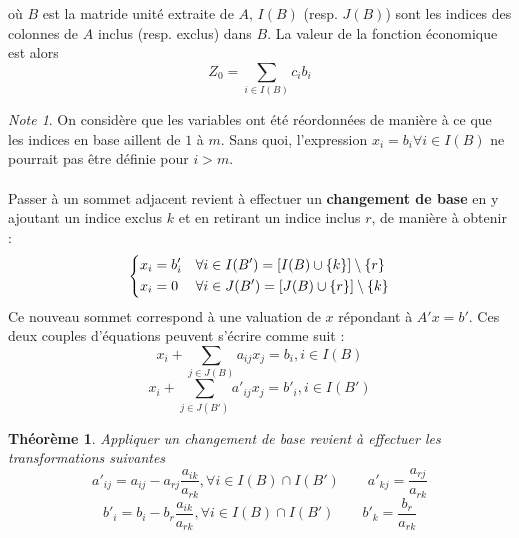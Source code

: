 \documentclass[a4paper]{report}
\theoremstyle{definition}
\theoremstyle{remark}
\newtheorem*{note}{Note}
\theoremstyle{plain}
\newtheorem{theorem}{Théorème}
\begin{document}
où $B$ est la matride unité extraite de \(A\), $I(B)$ (resp. $J(B)$) sont les
indices des colonnes de $A$ inclus (resp. exclus) dans $B$. La valeur de la
fonction économique est alors
\[Z_0=\sum_{i\in I(B)}c_ib_i\]

\begin{note}
On considère que les variables ont été réordonnées de manière à ce que les
indices en base aillent de \(1\) à \(m\). Sans quoi, l'expression \(x_i =
b_i\forall i \in I(B)\) ne pourrait pas être définie pour \(i > m\).
\end{note}

\paragraph{}
Passer à un sommet adjacent revient à effectuer un \textbf{changement de base}
en y ajoutant un indice exclus $k$ et en retirant un indice inclus $r$, de
manière à obtenir :
\[\begin{dcases}
	x_i = b'_i &\forall i \in I(B') = [I(B) \cup \{k\}] \setminus \{r\} \\
	x_i = 0    &\forall i \in J(B') = [J(B) \cup \{r\}] \setminus \{k\}
\end{dcases}\]
Ce nouveau sommet correspond à une valuation de $x$ répondant à $A'x = b'$.
Ces deux couples d'équations peuvent s'écrire comme suit :
\begin{equation}
\label{eq:base-general}
x_i + \sum_{j \in J(B)}{a_{ij}x_j} = b_i , i \in I(B)
\end{equation}
\begin{equation}
\label{eq:base'-general}
x_i + \sum_{j \in J(B')}{a'_{ij}x_j} = b'_i , i \in I(B')
\end{equation}

\begin{theorem}
Appliquer un changement de base revient à effectuer les transformations suivantes
\[a'_{ij} = a_{ij} - a_{rj} \frac{a_{ik}}{a_{rk}}, \forall i \in I(B) \cap I(B') \qquad a'_{kj} = \frac{a_{rj}}{a_{rk}}\]
\[b'_i = b_i - b_r \frac{a_{ik}}{a_{rk}}, \forall i \in I(B) \cap I(B') \qquad b'_{k} = \frac{b_r}{a_{rk}}\]
\end{theorem}
\end{document}
